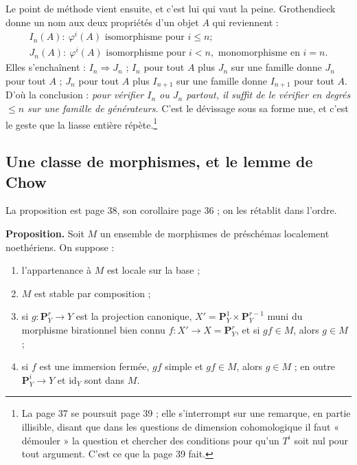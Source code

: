 \documentclass[11pt,a4paper]{article}
\begin{document}
Le point de méthode vient ensuite, et c'est lui qui vaut la peine. Grothendieck
donne un nom aux deux propriétés d'un objet $A$ qui reviennent :
\begin{gather*}
  I_{n}(A) : \ \varphi^{i}(A) \text{ isomorphisme pour } i \leqslant n ; \\
  J_{n}(A) : \ \varphi^{i}(A) \text{ isomorphisme pour } i < n,
  \text{ monomorphisme en } i = n .
\end{gather*}
Elles s'enchaînent : $I_{n} \Rightarrow J_{n}$ ; $I_{n}$ pour tout $A$ plus
$J_{n}$ sur une famille donne $J_{n}$ pour tout $A$ ; $J_{n}$ pour tout $A$
plus $I_{n+1}$ sur une famille donne $I_{n+1}$ pour tout $A$. D'où la
conclusion : \emph{pour vérifier $I_{n}$ ou $J_{n}$ partout, il suffit de le
vérifier en degrés $\leqslant n$ sur une famille de générateurs.} C'est le
dévissage sous sa forme nue, et c'est le geste que la liasse entière
répète.\footnote{La page 37 se poursuit page 39 ; elle s'interrompt sur une
remarque, en partie illisible, disant que dans les questions de dimension
cohomologique il faut « démouler » la question et chercher des conditions pour
qu'un $T^{i}$ soit nul pour tout argument. C'est ce que la page 39 fait.}

\subsection*{Une classe de morphismes, et le lemme de Chow}

La proposition est page 38, son corollaire page 36 ; on les rétablit dans
l'ordre.

\textbf{Proposition.} Soit $M$ un ensemble de morphismes de préschémas
localement noethériens. On suppose :

\begin{enumerate}
\item[a)] l'appartenance à $M$ est locale sur la base ;
\item[b)] $M$ est stable par composition ;
\item[c)] si $g : \mathbf{P}^{r}_{Y} \to Y$ est la projection canonique,
$X' = \mathbf{P}^{1}_{Y} \times \mathbf{P}^{r-1}_{Y}$ muni du morphisme
birationnel bien connu $f : X' \to X = \mathbf{P}^{r}_{Y}$, et si $gf \in M$,
alors $g \in M$ ;
\item[d)] si $f$ est une immersion fermée, $gf$ simple et $gf \in M$, alors
$g \in M$ ; en outre $\mathbf{P}^{i}_{Y} \to Y$ et $\mathrm{id}_{Y}$ sont dans
$M$.
\end{enumerate}
\end{document}
